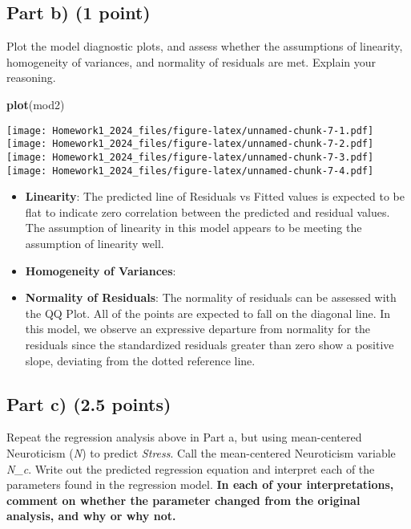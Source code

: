 \documentclass[
]{article}
\newenvironment{Shaded}{\begin{snugshade}}{\end{snugshade}}
\newcommand{\FunctionTok}[1]{\textcolor[rgb]{0.13,0.29,0.53}{\textbf{#1}}}
\newcommand{\NormalTok}[1]{#1}
\begin{document}
\hypertarget{part-b-1-point}{%
\subsection{\texorpdfstring{Part b) \textbf{(1
point)}}{Part b) (1 point)}}\label{part-b-1-point}}

Plot the model diagnostic plots, and assess whether the assumptions of
linearity, homogeneity of variances, and normality of residuals are met.
Explain your reasoning.

\begin{Shaded}
\begin{Highlighting}[]
\FunctionTok{plot}\NormalTok{(mod2)}
\end{Highlighting}
\end{Shaded}

\texttt{[image: Homework1\_2024\_files/figure-latex/unnamed-chunk-7-1.pdf]}
\texttt{[image: Homework1\_2024\_files/figure-latex/unnamed-chunk-7-2.pdf]}
\texttt{[image: Homework1\_2024\_files/figure-latex/unnamed-chunk-7-3.pdf]}
\texttt{[image: Homework1\_2024\_files/figure-latex/unnamed-chunk-7-4.pdf]}

\begin{itemize}
\item
  \textbf{Linearity}: The predicted line of Residuals vs Fitted values
  is expected to be flat to indicate zero correlation between the
  predicted and residual values. The assumption of linearity in this
  model appears to be meeting the assumption of linearity well.
\item
  \textbf{Homogeneity of Variances}:
\item
  \textbf{Normality of Residuals}: The normality of residuals can be
  assessed with the QQ Plot. All of the points are expected to fall on
  the diagonal line. In this model, we observe an expressive departure
  from normality for the residuals since the standardized residuals
  greater than zero show a positive slope, deviating from the dotted
  reference line.
\end{itemize}

\hypertarget{part-c-2.5-points}{%
\subsection{\texorpdfstring{Part c) \textbf{(2.5
points)}}{Part c) (2.5 points)}}\label{part-c-2.5-points}}

Repeat the regression analysis above in Part a, but using mean-centered
Neuroticism (\emph{N}) to predict \emph{Stress}. Call the mean-centered
Neuroticism variable \emph{N\_c}. Write out the predicted regression
equation and interpret each of the parameters found in the regression
model. \textbf{In each of your interpretations, comment on whether the
parameter changed from the original analysis, and why or why not.}
\end{document}
